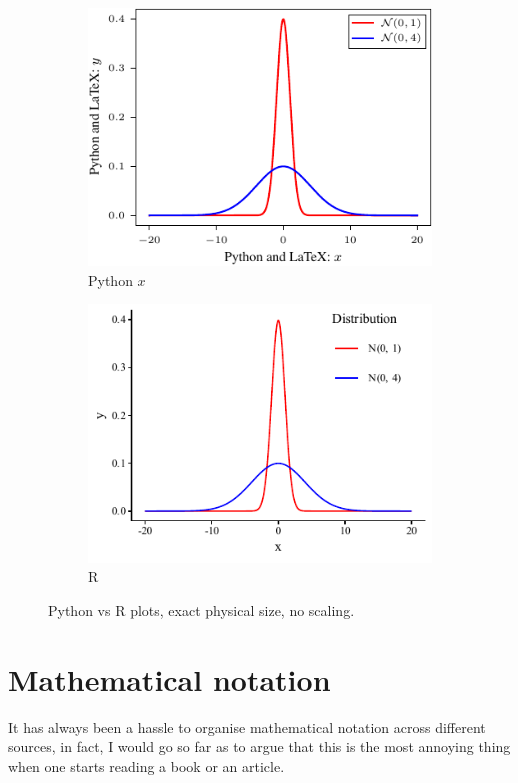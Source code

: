 \documentclass[aos,preprint]{imsart}
\begin{document}
\begin{figure}[htb]
	\centering
	\begin{subfigure}[t]{2.8in}
		\includegraphics{scatterplot-python.pdf}
		\caption{Python $x$}
	\end{subfigure}\hfill
	\begin{subfigure}[t]{2.8in}
		\includegraphics{scatterplot-R.pdf}
		\caption{R}
	\end{subfigure}

	\caption{Python vs R plots, exact physical size, no scaling.}
\end{figure}

\newpage
\section{Mathematical notation}

It has always been a hassle to organise mathematical notation across different sources,
in fact, I would go so far as to argue that this is the most annoying thing
when one starts reading a book or an article.
\end{document}
